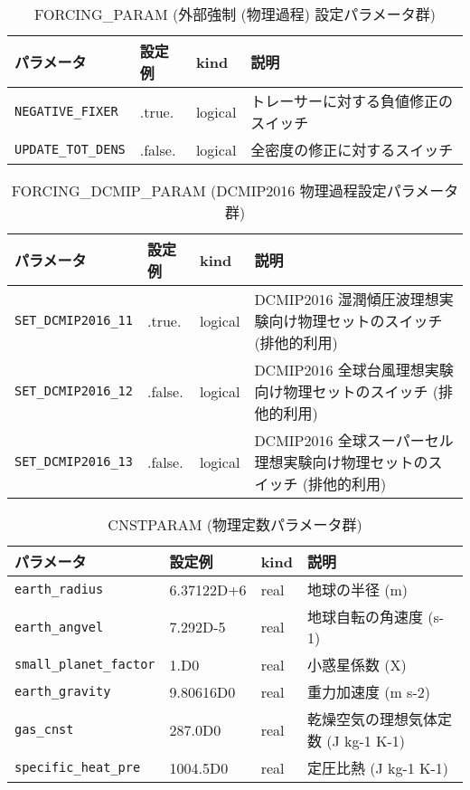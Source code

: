 \begin{table}[htb]
\begin{center}
\caption{FORCING\_PARAM (外部強制 (物理過程) 設定パラメータ群)}
\begin{tabularx}{150mm}{|l|l|l|X|} \hline
 \rowcolor[gray]{0.9} パラメータ & 設定例 & kind & 説明          \\ \hline
 \verb|NEGATIVE_FIXER|  & .true.  & logical & トレーサーに対する負値修正のスイッチ \\ \hline
 \verb|UPDATE_TOT_DENS| & .false. & logical & 全密度の修正に対するスイッチ \\ \hline
\end{tabularx}
\end{center}
\end{table}

\begin{table}[htb]
\begin{center}
\caption{FORCING\_DCMIP\_PARAM (DCMIP2016 物理過程設定パラメータ群)}
\begin{tabularx}{150mm}{|l|l|l|X|} \hline
 \rowcolor[gray]{0.9} パラメータ & 設定例 & kind & 説明          \\ \hline
 \verb|SET_DCMIP2016_11| & .true.  & logical & DCMIP2016 湿潤傾圧波理想実験向け物理セットのスイッチ (排他的利用) \\ \hline
 \verb|SET_DCMIP2016_12| & .false. & logical & DCMIP2016 全球台風理想実験向け物理セットのスイッチ (排他的利用) \\ \hline
 \verb|SET_DCMIP2016_13| & .false. & logical & DCMIP2016 全球スーパーセル理想実験向け物理セットのスイッチ (排他的利用) \\ \hline
\end{tabularx}
\end{center}
\end{table}

\begin{table}[htb]
\begin{center}
\caption{CNSTPARAM (物理定数パラメータ群)}
\begin{tabularx}{150mm}{|l|l|l|X|} \hline
 \rowcolor[gray]{0.9} パラメータ & 設定例 & kind & 説明          \\ \hline
 \verb|earth_radius| & 6.37122D+6  & real & 地球の半径 (m) \\ \hline
 \verb|earth_angvel| & 7.292D-5    & real & 地球自転の角速度 (s-1) \\ \hline
 \verb|small_planet_factor| & 1.D0 & real & 小惑星係数 (X) \\ \hline
 \verb|earth_gravity|       & 9.80616D0 & real & 重力加速度 (m s-2) \\ \hline
 \verb|gas_cnst|            & 287.0D0   & real & 乾燥空気の理想気体定数 (J kg-1 K-1) \\ \hline
 \verb|specific_heat_pre|   & 1004.5D0  & real & 定圧比熱 (J kg-1 K-1) \\ \hline
\end{tabularx}
\end{center}
\end{table}

